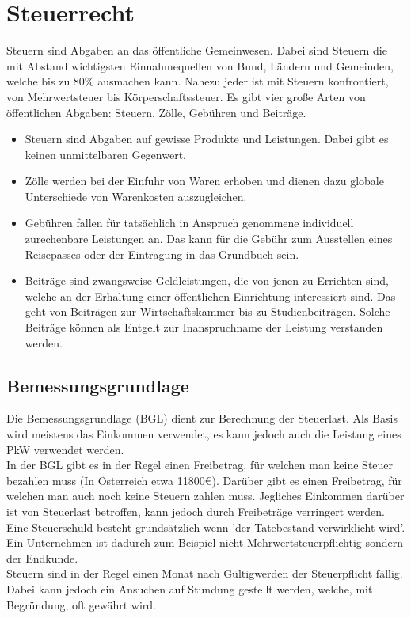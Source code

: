\documentclass{article}
\begin{document}
	\section{Steuerrecht}
	Steuern sind Abgaben an das öffentliche Gemeinwesen. Dabei sind Steuern die mit Abstand wichtigsten Einnahmequellen von Bund, Ländern und Gemeinden, welche bis zu 80\% ausmachen kann. Nahezu jeder ist mit Steuern konfrontiert, von Mehrwertsteuer bis Körperschaftssteuer. Es gibt vier große Arten von öffentlichen Abgaben: Steuern, Zölle, Gebühren und Beiträge. 
	\begin{itemize}
		\item{Steuern sind Abgaben auf gewisse Produkte und Leistungen. Dabei gibt es keinen unmittelbaren Gegenwert.}
		\item{Zölle werden bei der Einfuhr von Waren erhoben und dienen dazu globale Unterschiede von Warenkosten auszugleichen.}
		\item{Gebühren fallen für tatsächlich in Anspruch genommene individuell zurechenbare Leistungen an. Das kann für die Gebühr zum Ausstellen eines Reisepasses oder der Eintragung in das Grundbuch sein.}
		\item{Beiträge sind zwangsweise Geldleistungen, die von jenen zu Errichten sind, welche an der Erhaltung einer öffentlichen Einrichtung interessiert sind. Das geht von Beiträgen zur Wirtschaftskammer bis zu Studienbeiträgen. Solche Beiträge können als Entgelt zur Inanspruchname der Leistung verstanden werden.}
	\end{itemize}
	\subsection{Bemessungsgrundlage}
	Die Bemessungsgrundlage (BGL) dient zur Berechnung der Steuerlast. Als Basis wird meistens das Einkommen verwendet, es kann jedoch auch die Leistung eines PkW verwendet werden. \\
	In der BGL gibt es in der Regel einen Freibetrag, für welchen man keine Steuer bezahlen muss (In Österreich etwa 11800€). Darüber gibt es einen Freibetrag, für welchen man auch noch keine Steuern zahlen muss. Jegliches Einkommen darüber ist von Steuerlast betroffen, kann jedoch durch Freibeträge verringert werden. \\
	Eine Steuerschuld besteht grundsätzlich wenn 'der Tatebestand verwirklicht wird'. Ein Unternehmen ist dadurch zum Beispiel nicht Mehrwertsteuerpflichtig sondern der Endkunde. \\
	Steuern sind in der Regel einen Monat nach Gültigwerden der Steuerpflicht fällig. Dabei kann jedoch ein Ansuchen auf Stundung gestellt werden, welche, mit Begründung, oft gewährt wird. \\
\end{document}
